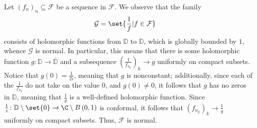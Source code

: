 \documentclass[10pt]{mypackage}
\renewcommand{\D}{\mathbb{D}}
\begin{document}
\begin{solution}
  Let $\left( f_{n} \right)_n\subseteq \mathcal{F}$ be a sequence in $\mathcal{F}$. We observe that the family
  \begin{align*}
    \mathcal{G} &= \set{\frac{1}{f} | f\in \mathcal{F}}
  \end{align*}
  consists of holomorphic functions from $\D$ to $\D$, which is globally bounded by $1$, whence $\mathcal{G}$ is normal. In particular, this means that there is some holomorphic function $g\colon \D\rightarrow \overline{\D}$ and a subsequence $\left( \frac{1}{f_{n_k}} \right)_k\rightarrow g$ uniformly on compact subsets. Notice that $g\left( 0 \right) = \frac{1}{2i}$, meaning that $g$ is nonconstant; additionally, since each of the $\frac{1}{f_{n_k}}$ do not take on the value $0$, and $g\left( 0 \right)\neq 0$, it follows that $g$ has no zeros in $\D$, meaning that $\frac{1}{g}$ is a well-defined holomorphic function. Since $\frac{1}{z}\colon \D\setminus \set{0}\rightarrow \C\setminus B\left( 0,1 \right)$ is conformal, it follows that $\left( f_{n_k} \right)_k\rightarrow \frac{1}{g}$ uniformly on compact subsets. Thus, $\mathcal{F}$ is normal.
\end{solution}
\end{document}
